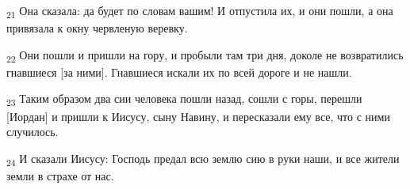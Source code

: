 \begin{tcolorbox}
\textsubscript{21} Она сказала: да будет по словам вашим! И отпустила их, и они пошли, а она привязала к окну червленую веревку.
\end{tcolorbox}
\begin{tcolorbox}
\textsubscript{22} Они пошли и пришли на гору, и пробыли там три дня, доколе не возвратились гнавшиеся [за ними]. Гнавшиеся искали их по всей дороге и не нашли.
\end{tcolorbox}
\begin{tcolorbox}
\textsubscript{23} Таким образом два сии человека пошли назад, сошли с горы, перешли [Иордан] и пришли к Иисусу, сыну Навину, и пересказали ему все, что с ними случилось.
\end{tcolorbox}
\begin{tcolorbox}
\textsubscript{24} И сказали Иисусу: Господь предал всю землю сию в руки наши, и все жители земли в страхе от нас.
\end{tcolorbox}
